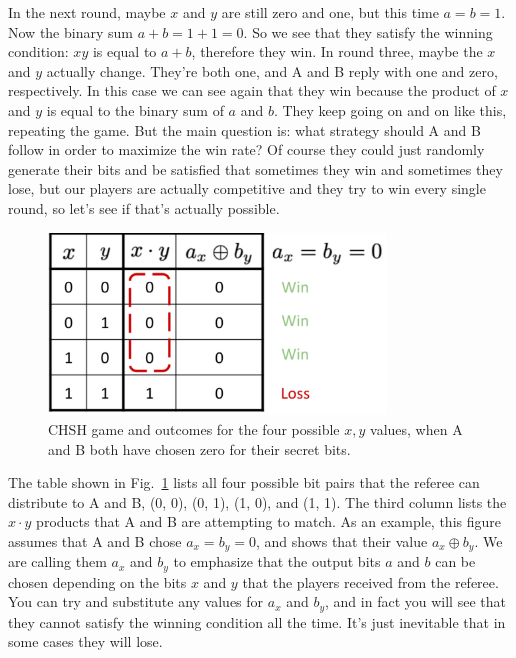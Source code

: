 In the next round, maybe $x$ and $y$ are still zero and one, but this time $a = b = 1$. Now the binary sum $a + b = 1 + 1 = 0$. So we see that they satisfy the winning condition: $xy$ is equal to $a + b$, therefore they win. In round three, maybe the $x$ and $y$ actually change. They're both one, and A and B reply with one and zero, respectively. In this case we can see again that they win because the product of $x$ and $y$ is equal to the binary sum of $a$ and $b$. They keep going on and on like this, repeating the game. But the main question is: what strategy should A and B follow in order to maximize the win rate? Of course they could just randomly generate their bits and be satisfied that sometimes they win and sometimes they lose, but our players are actually competitive and they try to win every single round, so let's see if that's actually possible.

\begin{figure}[H]
    \centering
    \includegraphics[width=0.8\textwidth]{lesson4/CHSH_annotated_table.pdf}
        \caption[CHSH game and outcomes]{CHSH game and outcomes for the four possible $x, y$ values, when A and B both have chosen zero for their secret bits.}
    \label{fig:chsh-table}
\end{figure}

The table shown in Fig.~\ref{fig:chsh-table} lists all four possible bit pairs that the referee can distribute to A and B, (0, 0), (0, 1), (1, 0), and (1, 1). The third column lists the $x\cdot y$ products that A and B are attempting to match. As an example, this figure assumes that A and B chose $a_x = b_y = 0$, and shows that their value $a_x \oplus b_y$. We are calling them $a_x$ and $b_y$ to emphasize that the output bits $a$ and $b$ can be chosen depending on the bits $x$ and $y$ that the players received from the referee. You can try and substitute any values for $a_x$ and $b_y$, and in fact you will see that they cannot satisfy the winning condition all the time. It's just inevitable that in some cases they will lose.

